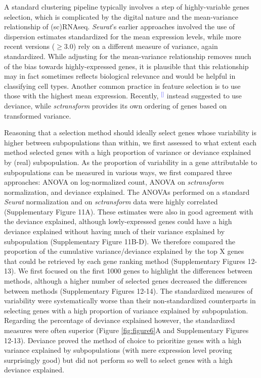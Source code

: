 \documentclass[11pt]{article}
\renewcommand{\cite}[1]{\textcolor{Blue}{$^[$\supercite{#1}$^]$}}
\begin{document}
A standard clustering pipeline typically involves a step of highly-variable genes selection, which is complicated by the digital nature and the mean-variance relationship of (sc)RNAseq. \textit{Seurat}'s earlier approaches involved the use of dispersion estimates standardized for the mean expression levels, while more recent versions ($\geq$3.0) rely on a different measure of variance, again standardized. While adjusting for the mean-variance relationship removes much of the bias towards highly-expressed genes, it is plausible that this relationship may in fact sometimes reflects biological relevance and would be helpful in classifying cell types. Another common practice in feature selection is to use those with the highest mean expression. Recently, \cite{townesGlmpca2019} instead suggested to use deviance, while \textit{sctransform} provides its own ordering of genes based on transformed variance.

Reasoning that a selection method should ideally select genes whose variability is higher between subpopulations than within, we first assessed to what extent each method selected genes with a high proportion of variance or deviance explained by (real) subpopulation. As the proportion of variability in a gene attributable to subpopulations can be measured in various ways, we first compared three approaches: ANOVA on log-normalized count, ANOVA on \textit{sctransform} normalization, and deviance explained. The ANOVAs performed on a standard \textit{Seurat} normalization and on \textit{sctransform} data were highly correlated (Supplementary Figure 11A). These estimates were also in good agreement with the deviance explained, although lowly-expressed genes could have a high deviance explained without having much of their variance explained by subpopulation (Supplementary Figure 11B-D). We therefore compared the proportion of the cumulative variance/deviance explained by the top X genes that could be retrieved by each gene ranking method (Supplementary Figures 12-13). We first focused on the first 1000 genes to highlight the differences between methods, although a higher number of selected genes decreased the differences between methods (Supplementary Figures 12-14). The standardized measures of variability were systematically worse than their non-standardized counterparts in selecting genes with a high proportion of variance explained by subpopulation. Regarding the percentage of deviance explained however, the standardized measures were often superior (Figure \ref{fig:figure6}A and Supplementary Figures 12-13). Deviance proved the method of choice to prioritize genes with a high variance explained by subpopulations (with mere expression level proving surprisingly good) but did not perform so well to select genes with a high deviance explained.
\end{document}
